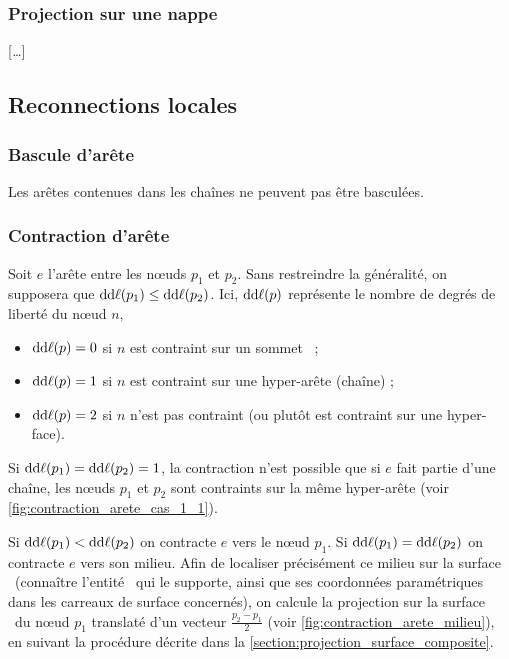 

\subsubsection{Projection sur une nappe}

[\textit{\ldots}]


\subsection{Reconnections locales}
\subsubsection{Bascule d'arête}
Les arêtes contenues dans les chaînes ne peuvent pas être basculées.

\subsubsection{Contraction d'arête}
Soit $e$ l'arête entre les n\oe uds $p_1$ et $p_2$. Sans restreindre la généralité, on supposera que $\mathrm{dd}\ell(p_1) \leq 
\mathrm{dd}\ell(p_2)$.
Ici, $\mathrm{dd}\ell(p)$ représente le nombre de degrés de liberté du n\oe ud $n$, \ie 
\begin{itemize}
	\item $\mathrm{dd}\ell(p) = 0$ si $n$ est contraint sur un sommet \brep\ ;
	\item $\mathrm{dd}\ell(p) = 1$ si $n$ est contraint sur une hyper-arête (chaîne) ;
	\item $\mathrm{dd}\ell(p) = 2$ si $n$ n'est pas contraint (ou plutôt est contraint sur une hyper-face).
\end{itemize}
Si $\mathrm{dd}\ell(p_1) = \mathrm{dd}\ell(p_2) = 1$, la contraction n'est possible que si $e$ fait partie d'une chaîne, \ie les n\oe uds $p_1$ et $p_2$ sont contraints sur la même hyper-arête (voir \autoref{fig:contraction_arete_cas_1_1}).



Si $\mathrm{dd}\ell(p_1) < \mathrm{dd}\ell(p_2)$ on contracte $e$ vers le n\oe ud $p_1$. 
Si $\mathrm{dd}\ell(p_1) = \mathrm{dd}\ell(p_2)$ on contracte $e$ vers son milieu. Afin de localiser précisément ce milieu sur la surface \brep\ (\ie connaître l'entité \brep\ qui le supporte, ainsi que ses coordonnées paramétriques dans les carreaux de surface concernés), on calcule la projection sur la surface \brep\ du n\oe ud $p_1$ translaté d'un vecteur $\frac{p_2 - p_1}{2}$ (voir \autoref{fig:contraction_arete_milieu}), en suivant la procédure décrite dans la \autoref{section:projection_surface_composite}.

